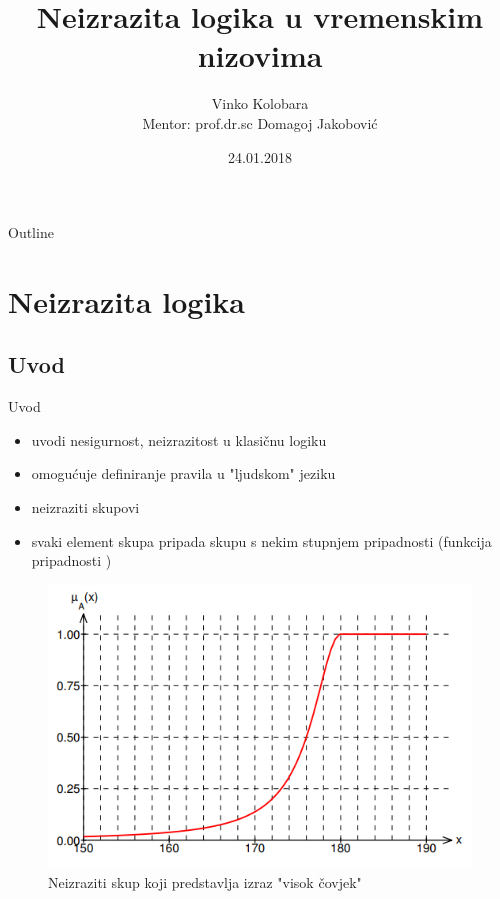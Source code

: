 \documentclass{beamer}
\title[NLVN]{Neizrazita logika u vremenskim nizovima}
\author[Vinko Kolobara]{Vinko Kolobara\\{\footnotesize Mentor: prof.dr.sc Domagoj Jakobović}}
\institute{Fakultet Elektrotehnike i Računarstva, Zagreb}
\date{24.01.2018}
\begin{document}
\begin{frame}
  \titlepage
\end{frame}

\begin{frame}{Outline}
  \tableofcontents
\end{frame}


\section{Neizrazita logika}

\subsection{Uvod}
\begin{frame}{Uvod}

\begin{itemize}
  \item uvodi nesigurnost, neizrazitost u klasičnu logiku
  \item omogućuje definiranje pravila u "ljudskom" jeziku
  \item neizraziti skupovi
  \item svaki element skupa pripada skupu s nekim stupnjem pripadnosti (funkcija pripadnosti )
\end{itemize}

\end{frame}

\begin{frame}{}
\begin{figure}[h]
  \includegraphics[width=\textwidth]{img/fuzzy_tall.PNG}
  \caption{Neizraziti skup koji predstavlja izraz "visok čovjek"}
\end{figure}
\end{frame}
\end{document}
